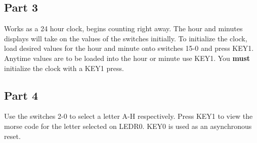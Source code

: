\documentclass[oneside,letterpaper,12pt,titlepage]{article}
\begin{document}
\subsection{Part 3}
Works as a 24 hour clock, begins counting right away. The hour and minutes displays will take on the values of the switches initially. To initialize the clock, load desired values for the hour and minute onto switches 15-0 and press KEY1. Anytime values are to be loaded into the hour or minute use KEY1. You \textbf{must} initialize the clock with a KEY1 press.

\subsection{Part 4}
Use the switches 2-0 to select a letter A-H respectively. Press KEY1 to view the morse code for the letter selected on LEDR0. KEY0 is used as an asynchronous reset.
\end{document}
